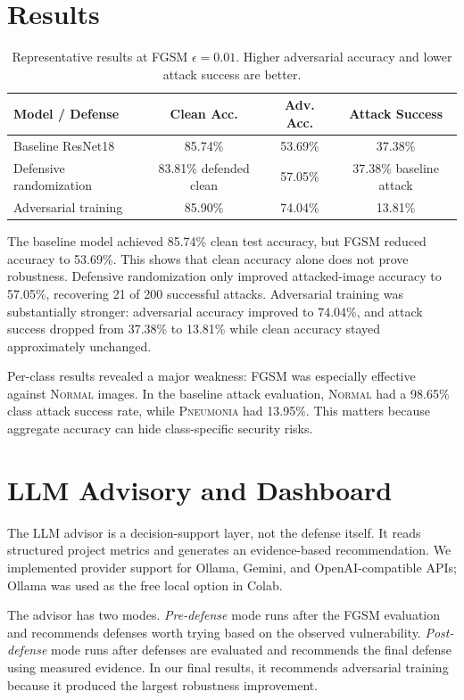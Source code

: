 ﻿\documentclass[10pt]{article}
\begin{document}
\section{Results}
\begin{table}[h]
\centering
\small
\begin{tabular}{lccc}
\toprule
\textbf{Model / Defense} & \textbf{Clean Acc.} & \textbf{Adv. Acc.} & \textbf{Attack Success} \\
\midrule
Baseline ResNet18 & 85.74\% & 53.69\% & 37.38\% \\
Defensive randomization & 83.81\% defended clean & 57.05\% & 37.38\% baseline attack \\
Adversarial training & 85.90\% & 74.04\% & 13.81\% \\
\bottomrule
\end{tabular}
\caption{Representative results at FGSM $\epsilon=0.01$. Higher adversarial accuracy and lower attack success are better.}
\end{table}

The baseline model achieved 85.74\% clean test accuracy, but FGSM reduced accuracy to 53.69\%. This shows that clean accuracy alone does not prove robustness. Defensive randomization only improved attacked-image accuracy to 57.05\%, recovering 21 of 200 successful attacks. Adversarial training was substantially stronger: adversarial accuracy improved to 74.04\%, and attack success dropped from 37.38\% to 13.81\% while clean accuracy stayed approximately unchanged.

Per-class results revealed a major weakness: FGSM was especially effective against \textsc{Normal} images. In the baseline attack evaluation, \textsc{Normal} had a 98.65\% class attack success rate, while \textsc{Pneumonia} had 13.95\%. This matters because aggregate accuracy can hide class-specific security risks.

\section{LLM Advisory and Dashboard}
The LLM advisor is a decision-support layer, not the defense itself. It reads structured project metrics and generates an evidence-based recommendation. We implemented provider support for Ollama, Gemini, and OpenAI-compatible APIs; Ollama was used as the free local option in Colab.

The advisor has two modes. \textit{Pre-defense} mode runs after the FGSM evaluation and recommends defenses worth trying based on the observed vulnerability. \textit{Post-defense} mode runs after defenses are evaluated and recommends the final defense using measured evidence. In our final results, it recommends adversarial training because it produced the largest robustness improvement.
\end{document}

